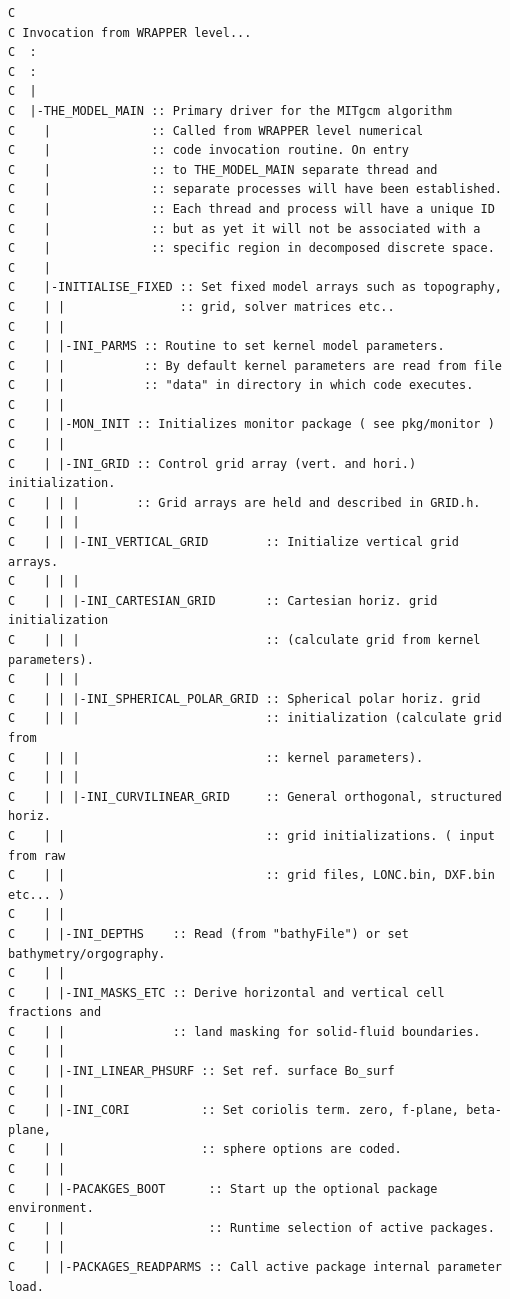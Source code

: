 {\footnotesize
\begin{verbatim}
C
C Invocation from WRAPPER level...
C  :
C  :
C  |
C  |-THE_MODEL_MAIN :: Primary driver for the MITgcm algorithm
C    |              :: Called from WRAPPER level numerical
C    |              :: code invocation routine. On entry
C    |              :: to THE_MODEL_MAIN separate thread and
C    |              :: separate processes will have been established.
C    |              :: Each thread and process will have a unique ID
C    |              :: but as yet it will not be associated with a
C    |              :: specific region in decomposed discrete space.
C    |
C    |-INITIALISE_FIXED :: Set fixed model arrays such as topography, 
C    | |                :: grid, solver matrices etc..
C    | |              
C    | |-INI_PARMS :: Routine to set kernel model parameters.
C    | |           :: By default kernel parameters are read from file 
C    | |           :: "data" in directory in which code executes.
C    | |
C    | |-MON_INIT :: Initializes monitor package ( see pkg/monitor )
C    | |
C    | |-INI_GRID :: Control grid array (vert. and hori.) initialization.
C    | | |        :: Grid arrays are held and described in GRID.h.
C    | | |
C    | | |-INI_VERTICAL_GRID        :: Initialize vertical grid arrays.
C    | | |
C    | | |-INI_CARTESIAN_GRID       :: Cartesian horiz. grid initialization
C    | | |                          :: (calculate grid from kernel parameters).
C    | | |
C    | | |-INI_SPHERICAL_POLAR_GRID :: Spherical polar horiz. grid 
C    | | |                          :: initialization (calculate grid from 
C    | | |                          :: kernel parameters).
C    | | |
C    | | |-INI_CURVILINEAR_GRID     :: General orthogonal, structured horiz.
C    | |                            :: grid initializations. ( input from raw
C    | |                            :: grid files, LONC.bin, DXF.bin etc... )
C    | |
C    | |-INI_DEPTHS    :: Read (from "bathyFile") or set bathymetry/orgography.
C    | |
C    | |-INI_MASKS_ETC :: Derive horizontal and vertical cell fractions and
C    | |               :: land masking for solid-fluid boundaries.
C    | |
C    | |-INI_LINEAR_PHSURF :: Set ref. surface Bo_surf
C    | |
C    | |-INI_CORI          :: Set coriolis term. zero, f-plane, beta-plane,
C    | |                   :: sphere options are coded.
C    | |
C    | |-PACAKGES_BOOT      :: Start up the optional package environment.
C    | |                    :: Runtime selection of active packages.
C    | |
C    | |-PACKAGES_READPARMS :: Call active package internal parameter load.

\end{verbatim}}
